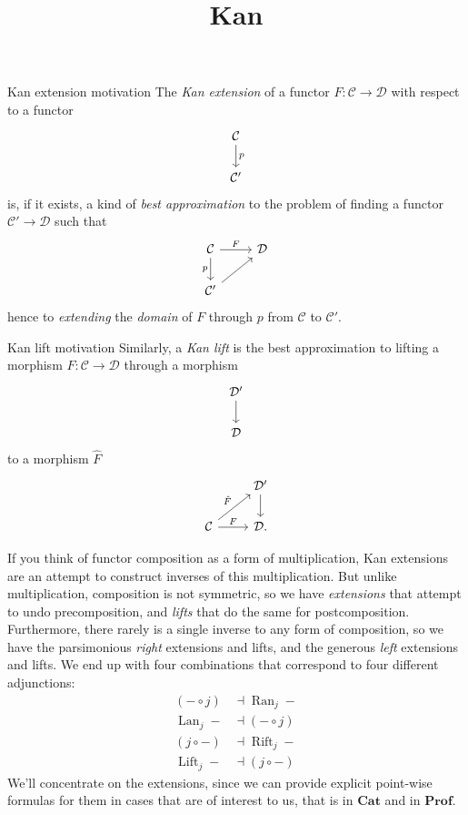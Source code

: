 \documentclass{beamer}
\title{Kan}
\date{}
\begin{document}
\begin{frame}
    \titlepage
\end{frame}

\begin{frame}[fragile]{Kan extension motivation}
The \emph{Kan extension} of a functor $F \colon \mathcal{C} \to \mathcal{D}$ with respect to a functor
\[
\begin{tikzcd}
\mathcal{C} \arrow[d, "p"] \\
\mathcal{C}'
\end{tikzcd}
\]
is, if it exists, a kind of \emph{best approximation} to the problem of finding a functor $\mathcal{C}' \to \mathcal{D}$ such that
\[
\begin{tikzcd}
\mathcal{C} \arrow[r, "F"] \arrow[d, "p"'] & \mathcal{D} \\
\mathcal{C}' \arrow[ur]
\end{tikzcd}
\]
hence to \emph{extending} the \emph{domain} of $F$ through $p$ from $\mathcal{C}$ to $\mathcal{C}'$.
\end{frame}

\begin{frame}[fragile]{Kan lift motivation}
Similarly, a \emph{Kan lift} is the best approximation to lifting a morphism $F \colon \mathcal{C} \to \mathcal{D}$ through a morphism
\[
\begin{tikzcd}
\mathcal{D}' \arrow[d] \\
\mathcal{D}
\end{tikzcd}
\]
to a morphism $\hat{F}$
\[
\begin{tikzcd}
 & \mathcal{D}' \arrow[d] \\
\mathcal{C} \arrow[r, "F"] \arrow[ur, "\hat{F}"] & \mathcal{D}.
\end{tikzcd}
\]
\end{frame}

\begin{frame}{\cite{blog_kan}}
If you think of functor composition as a form of multiplication, Kan extensions
are an attempt to construct inverses of this multiplication. But unlike
multiplication, composition is not symmetric, so we have \emph{extensions} that
attempt to undo precomposition, and \emph{lifts} that do the same for
postcomposition. Furthermore, there rarely is a single inverse to any form of
composition, so we have the parsimonious \emph{right} extensions and lifts, and
the generous \emph{left} extensions and lifts. We end up with four combinations
that correspond to four different adjunctions:
\begin{align*}
(- \circ j) &\dashv \operatorname{Ran}_j - \\
\operatorname{Lan}_j - &\dashv (- \circ j) \\
(j \circ -) &\dashv \operatorname{Rift}_j - \\
\operatorname{Lift}_j - &\dashv (j \circ -)
\end{align*}
We'll concentrate on the extensions, since we can provide explicit point-wise
formulas for them in cases that are of interest to us, that is in $\mathbf{Cat}$
and in $\mathbf{Prof}$.
\end{frame}
\end{document}
